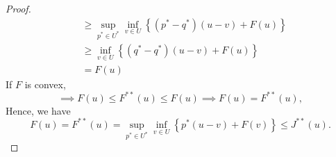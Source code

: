 \begin{theorem}
\begin{proof}
\begin{align*}
					  &\geq \sup_{p^* \in U^*} \inf_{v \in U} \left\lbrace \left(p^*-q^*\right)(u-v)+F(u)\right\rbrace\\
					  &\geq \inf_{v \in U} \left\lbrace (q^*-q^*)(u-v)+F(u) \right\rbrace\\
					  &=F(u)
		\end{align*}
	If $F$ is convex,
	\begin{equation*}
		\implies F(u)\leq F^{**}(u)\leq F(u) \implies F(u)=F^{**}(u),
	\end{equation*}
	Hence, we have
	\begin{equation*}
	F(u)=F^{**}(u)=\sup_{p^* \in U^*} \inf_{v \in U} \left\lbrace p^*(u-v)+F(v)\right\rbrace \leq J^{**}(u).
	\end{equation*}
	\end{proof}
\end{theorem}
